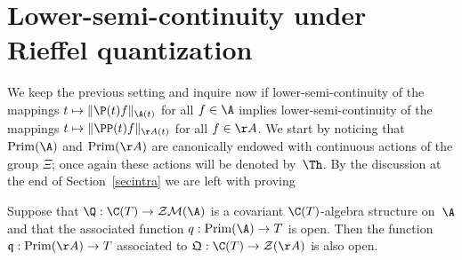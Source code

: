 \section{Lower-semi-continuity under Rief\/fel quantization}\label{joasa}

We keep the previous setting and inquire now if lower-semi-continuity of the mappings
$t\mapsto\| \P(t)f\|_{\A(t)}$ for all $f\in\A$ implies lower-semi-continuity of the mappings
$t\mapsto\| \PP(t)f\|_{\AA(t)}$ for all $f\in\AA$. We start by noticing that
${\rm Prim}(\A)$ and ${\rm Prim}(\AA)$
are canonically endowed with continuous actions of the group $\Xi$; once again these actions will be denoted by~$\Th$.
By the discussion at the end of Section~\ref{secintra} we are left with proving

\begin{Proposition}\label{segund}
Suppose that $\Q:\C(T)\to \mathcal Z\mathcal M(\A)$ is a covariant $\C(T)$-algebra structure on~$\A$ and that the associated function
$q:{\rm Prim}(\A)\to T$ is open. Then the function $\mathfrak q:{\rm Prim}(\AA)\to T$ associated to
$\mathfrak Q:\C(T)\to \mathcal Z(\AA)$ is also open.
\end{Proposition}

